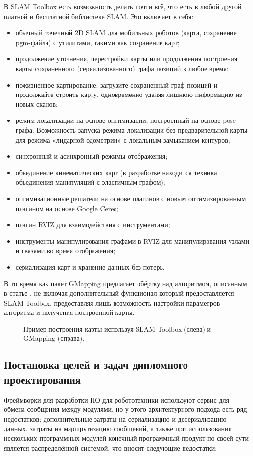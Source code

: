 В SLAM Toolbox есть возможность делать почти всё, что есть в любой другой
платной и бесплатной библиотеке SLAM. Это включает в себя:
\begin{itemize}
	\item обычный точечный 2D SLAM для мобильных роботов (карта,
		сохранение pgm-файла) с утилитами, такими как сохранение карт;
	\item продолжение уточнения, перестройки карты или продолжения построения
		карты сохраненного (сериализованного) графа позиций в любое время;
	\item пожизненное картирование: загрузите сохраненный граф позиций и
		продолжайте строить карту, одновременно удаляя лишнюю
		информацию из новых сканов;
	\item режим локализации на основе оптимизации, построенный на основе
		pose-графа. Возможность запуска режима локализации без предварительной
		карты для режима «лидарной одометрии» с локальным замыканием контуров;
	\item синхронный и асинхронный режимы отображения;
	\item объединение кинематических карт (в разработке находится техника
		объединения манипуляций с эластичным графом);
	\item оптимизационные решатели на основе плагинов с новым оптимизированным
		плагином на основе Google Ceres;
	\item плагин RVIZ для взаимодействия с инструментами;
	\item инструменты манипулирования графами в RVIZ для манипулирования узлами
		и связями во время отображения;
	\item сериализация карт и хранение данных без потерь.
\end{itemize}

В то время как пакет GMapping предлагает обёртку над алгоритмом,
описанным в статье \cite{grisetti2005improving}, не включая дополнительный
функционал который предоставляется SLAM Toolbox, предоставляя лишь возможность
настройки параметров алгоритма и получения построенной карты.

\begin{figure}[h]
\centering
	\caption{Пример построения карты используя SLAM Toolbox (слева) и GMapping
	(справа).}
\end{figure}

\subsection{Постановка целей и задач дипломного проектирования}
Фреймворки для разработки ПО для робототехники используют сервис для обмена
сообщения между модулями, но у этого архитектурного подхода есть ряд
недостатков: дополнительные затраты на сериализацию и десериализацию данных,
затраты на маршрутизацию сообщений, а также при использовании нескольких
программных модулей конечный программный продукт по своей сути является
распределённой системой, что вносит следующие недостатки:

